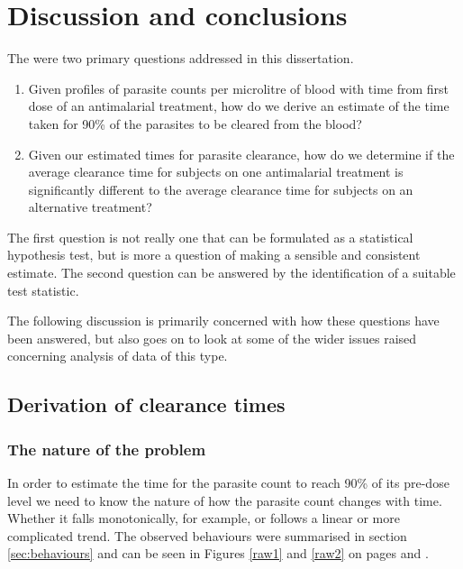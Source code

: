 \chapter{Discussion and conclusions}\label{ch:discussion}
The were two primary questions addressed in this dissertation.
\begin{enumerate}
\item Given profiles of parasite counts per microlitre of blood with time from first dose of an antimalarial treatment, how do we derive an estimate of the time taken for 90\% of the parasites to be cleared from the blood?
\item Given our estimated times for parasite clearance, how do we determine if the average clearance time for subjects on one antimalarial treatment is significantly different to the average clearance time for subjects on an alternative treatment?
\end{enumerate}
The first question is not really one that can be formulated as a statistical hypothesis test, but is more a question of making a sensible and consistent estimate. The second question can be answered by the identification of a suitable test statistic.

The following discussion is primarily concerned with how these questions have been answered, but also goes on to look at some of the wider issues raised concerning analysis of data of this type.

\section{Derivation of clearance times}

\subsection{The nature of the problem}
In order to estimate the time for the parasite count to reach 90\% of its pre-dose level we need to know the nature of how the parasite count changes with time. Whether it falls monotonically, for example, or follows a linear or more complicated trend. The observed behaviours were summarised in section \ref{sec:behaviours} and can be seen in Figures \ref{raw1} and \ref{raw2} on pages \pageref{raw1} and \pageref{raw2}.

